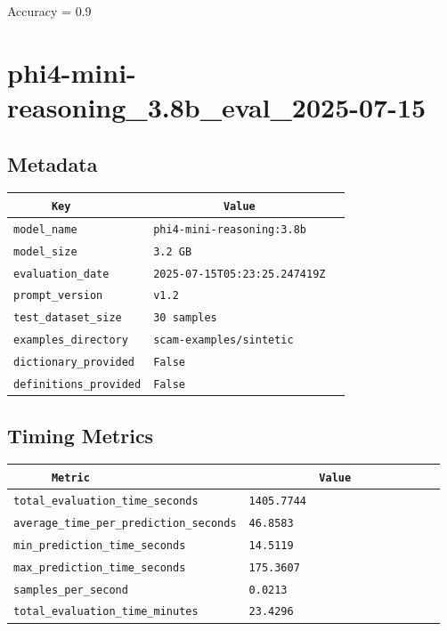 \documentclass{article}
\begin{document}
\begin{center}
Accuracy = 0.9
\end{center}

\section{phi4-mini-reasoning\_3.8b\_eval\_2025-07-15}
\subsection{Metadata}

\begin{center}
\begin{tabular}{l | l} \hline
    \verb|      Key      | & \verb|           Value           | \\ \hline
    \hline
    \verb|model_name    | & \verb|phi4-mini-reasoning:3.8b     | \\ \hline
    \verb|model_size    | & \verb|3.2 GB                       | \\ \hline
    \verb|evaluation_date| & \verb|2025-07-15T05:23:25.247419Z  | \\ \hline
    \verb|prompt_version| & \verb|v1.2                         | \\ \hline
    \verb|test_dataset_size| & \verb|30 samples                   | \\ \hline
    \verb|examples_directory| & \verb|scam-examples/sintetic       | \\ \hline
    \verb|dictionary_provided| & \verb|False                        | \\ \hline
    \verb|definitions_provided| & \verb|False                        | \\ \hline
\end{tabular}
\end{center}

\subsection{Timing Metrics}

\begin{center}
\begin{tabular}{l | l} \hline
    \verb|      Metric     | & \verb|           Value           | \\ \hline
    \hline
    \verb|total_evaluation_time_seconds| & \verb|1405.7744                    | \\ \hline
    \verb|average_time_per_prediction_seconds| & \verb|46.8583                      | \\ \hline
    \verb|min_prediction_time_seconds| & \verb|14.5119                      | \\ \hline
    \verb|max_prediction_time_seconds| & \verb|175.3607                     | \\ \hline
    \verb|samples_per_second| & \verb|0.0213                       | \\ \hline
    \verb|total_evaluation_time_minutes| & \verb|23.4296                      | \\ \hline
\end{tabular}
\end{center}
\end{document}
